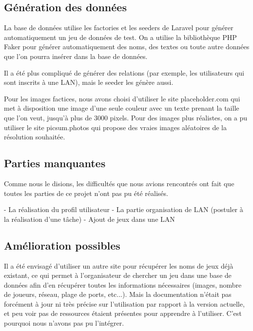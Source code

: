\documentclass[12pt]{article}
\begin{document}
\subsection{Génération des données}

La base de données utilise les factories et les seeders de Laravel pour générer automatiquement un jeu de données de test. On a utilise la bibliothèque PHP Faker pour générer automatiquement des noms, des textes ou toute autre données que l'on pourra insérer dans la base de données.

Il a été plus compliqué de générer des relations (par exemple, les utilisateurs qui sont inscrits à une LAN), mais le seeder les génère aussi.

Pour les images factices, nous avons choisi d'utiliser le site placeholder.com qui met à disposition une image d'une seule couleur avec un texte prenant la taille que l'on veut, jusqu'à plus de 3000 pixels. Pour des images plus réalistes, on a pu utiliser le site picsum.photos qui propose des vraies images aléatoires de la résolution souhaitée.

\subsection{Parties manquantes}
Comme nous le disions, les difficultés que nous avions rencontrés ont fait que toutes les parties de ce projet n'ont pas pu été réalisés.

- La réalisation du profil utilisateur
- La partie organisation de LAN (postuler à la réalisation d'une tâche)
- Ajout de jeux dans une LAN

\subsection{Amélioration possibles}

Il a été envisagé d'utiliser un autre site pour récupérer les noms de jeux déjà existant, ce qui permet à l'organisateur de chercher un jeu dans une base de données afin d'en récupérer toutes les informations nécessaires (images, nombre de joueurs, réseau, plage de ports, etc...). Mais la documentation n'était pas forcément à jour ni très précise sur l'utilisation par rapport à la version actuelle, et peu voir pas de ressources étaient présentes pour apprendre à l'utiliser. C'est pourquoi nous n'avons pas pu l'intégrer.
\end{document}
